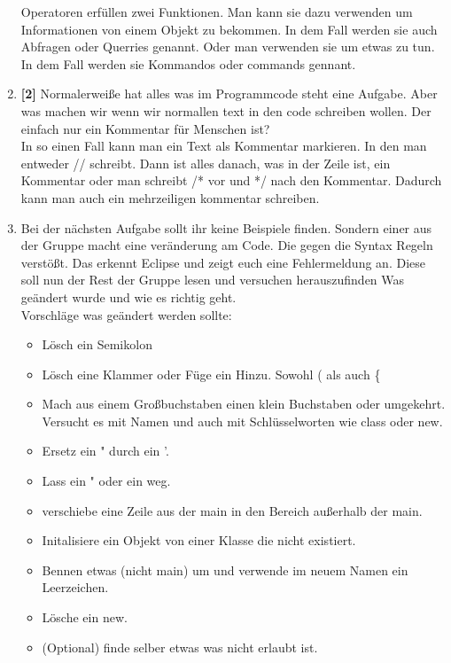 \begin{enumerate}
    \begin{Infobox}[Operatoren]
        Operatoren erfüllen zwei Funktionen. Man kann sie dazu verwenden um Informationen von einem Objekt zu bekommen. In dem Fall werden sie auch Abfragen oder Querries genannt.
        Oder man verwenden sie um etwas zu tun. In dem Fall werden sie Kommandos oder commands gennant.
    \end{Infobox}
    \item \textbf{[2]} Normalerweiße hat alles was im Programmcode steht eine Aufgabe. Aber was machen wir wenn wir normallen text in den code schreiben wollen. Der einfach nur ein Kommentar für Menschen ist?\\
    In so einen Fall kann man ein Text als Kommentar markieren. In den man entweder // schreibt. Dann ist alles danach, was in der Zeile ist, ein Kommentar oder man schreibt /* vor und */ nach den Kommentar. Dadurch kann man auch ein mehrzeiligen kommentar schreiben.
    \item Bei der nächsten Aufgabe sollt ihr keine Beispiele finden. Sondern einer aus der Gruppe macht eine veränderung am Code. Die gegen die Syntax Regeln verstößt. Das erkennt Eclipse und zeigt euch eine Fehlermeldung an. Diese soll nun der Rest der Gruppe lesen und versuchen herauszufinden Was geändert wurde und wie es richtig geht.\\
    Vorschläge was geändert werden sollte:
    \begin{itemize}
        \item Lösch ein Semikolon
        \item Lösch eine Klammer oder Füge ein Hinzu. Sowohl ( als auch \{
        \item Mach aus einem Großbuchstaben einen klein Buchstaben oder umgekehrt. Versucht es mit Namen und auch mit Schlüsselworten wie class oder new.
        \item Ersetz ein " durch ein '.
        \item Lass ein " oder ein weg.
        \item verschiebe eine Zeile aus der main in den Bereich außerhalb der main.
        \item Initalisiere ein Objekt von einer Klasse die nicht existiert.
        \item Bennen etwas (nicht main) um und verwende im neuem Namen ein Leerzeichen.
        \item Lösche ein new.
        \item (Optional) finde selber etwas was nicht erlaubt ist.
    \end{itemize}
\end{enumerate}
